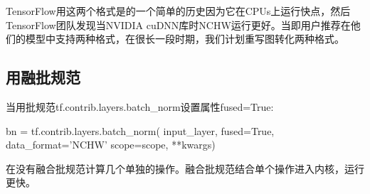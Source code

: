 TensorFlow用这两个格式是的一个简单的历史因为它在CPUs上运行快点，然后TensorFlow团队发现当NVIDIA cuDNN库时NCHW运行更好。当即用户推荐在他们的模型中支持两种格式，在很长一段时期，我们计划重写图转化两种格式。
\subsection{用融批规范}
当用批规范tf.contrib.layers.batch\_norm设置属性fused=True:
\begin{python}
bn = tf.contrib.layers.batch_norm(
          input_layer, fused=True, data_format='NCHW'
          scope=scope, **kwargs)
\end{python}
在没有融合批规范计算几个单独的操作。融合批规范结合单个操作进入内核，运行更快。
